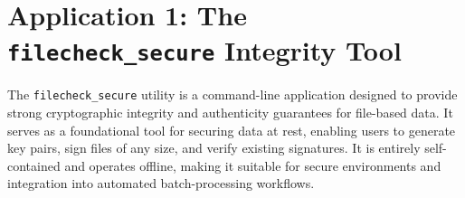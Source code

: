 \documentclass[12pt, letterpaper]{article}
\begin{document}
	
	
\section{Application 1: The \texttt{filecheck\_secure} Integrity Tool}
The \texttt{filecheck\_secure} utility is a command-line application designed to provide strong cryptographic integrity and authenticity guarantees for file-based data. It serves as a foundational tool for securing data at rest, enabling users to generate key pairs, sign files of any size, and verify existing signatures. It is entirely self-contained and operates offline, making it suitable for secure environments and integration into automated batch-processing workflows.
\end{document}
